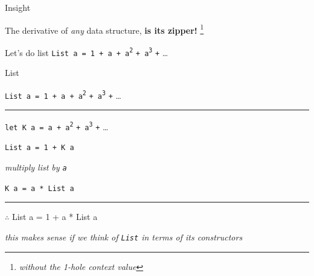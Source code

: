 \begin{frame}
\begin{block}{Insight}
\begin{center}
  The derivative of \emph{any} data structure, \textbf{is its zipper!}\cite{abbott2005data} \footnote{\emph{without the 1-hole context value}}
\end{center}
\end{block}
\end{frame}



\begin{frame}
\begin{block}{Let's do list}
\lstinline{List a = 1 + a + a}\textsuperscript{\lstinline{2}} \lstinline{+ a}\textsuperscript{\lstinline{3}} \lstinline{+} \ldots
\end{block}
\end{frame}

\begin{frame}{List}

\lstinline{List a = 1 + a + a}\textsuperscript{\lstinline{2}} \lstinline{+ a}\textsuperscript{\lstinline{3}} \lstinline{+} \ldots

\par\noindent\rule{\textwidth}{0.4pt}

\lstinline{let K a = a + a}\textsuperscript{\lstinline{2}} \lstinline{+ a}\textsuperscript{\lstinline{3}} \lstinline{+} \ldots

\lstinline{List a = 1 + K a}

\emph{\tiny{multiply list by \lstinline{a}}}

\lstinline{K a = a * List a}

\par\noindent\rule{\textwidth}{0.4pt}

{$\therefore$} List a = 1 + a * List a

\emph{\tiny{this makes sense if we think of \lstinline{List} in terms of its constructors}}

\end{frame}


